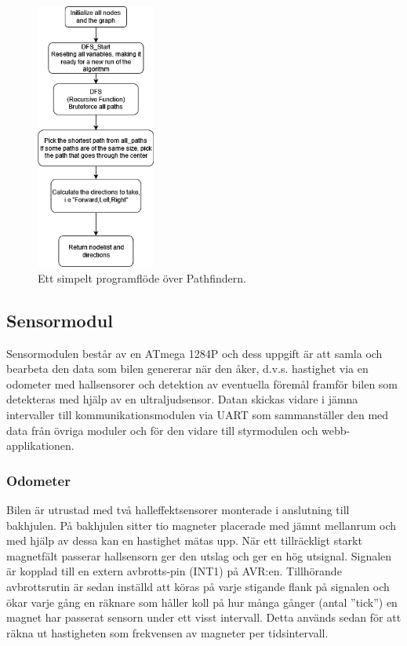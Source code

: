 \documentclass[10pt,oneside,swedish]{lips}
\begin{document}
\begin{figure}[htbp]
  \centering
  \includegraphics[width=0.35\textwidth]{./Figures/Pathfinder.png}
  \caption{Ett simpelt programflöde över Pathfindern.}
  \label{fig:Grafen_noderna.png}
\end{figure}

\clearpage

\subsection{Sensormodul}
Sensormodulen består av en ATmega 1284P och dess uppgift är att samla och bearbeta den data som bilen genererar när den åker, d.v.s. hastighet via en odometer med hallsensorer och detektion av eventuella föremål framför bilen som detekteras med hjälp av en ultraljudsensor.
Datan skickas vidare i jämna intervaller till kommunikationsmodulen via UART som sammanställer den med data från övriga moduler och för den vidare till styrmodulen och webb-applikationen. 


\subsubsection{Odometer}

Bilen är utrustad med två halleffektsensorer monterade i anslutning till bakhjulen. På bakhjulen sitter tio magneter placerade med jämnt mellanrum och med hjälp av dessa kan en hastighet mätas upp. När ett tillräckligt starkt magnetfält passerar hallsensorn ger den utslag och ger en hög utsignal. Signalen är kopplad till en extern avbrotts-pin (INT1) på AVR:en. Tillhörande avbrottsrutin är sedan inställd att köras på varje stigande flank på signalen och ökar varje gång en räknare som håller koll på hur många gånger (antal ''tick'') en magnet har passerat sensorn under ett visst intervall.
Detta används sedan för att räkna ut hastigheten som frekvensen av magneter per tidsintervall.
\end{document}
